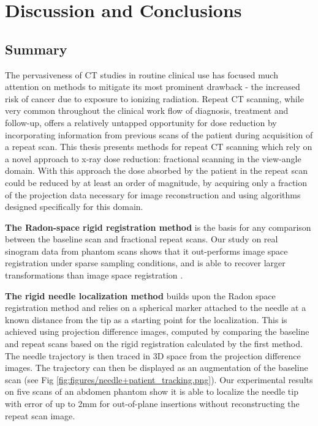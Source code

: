 \chapter{Discussion and Conclusions}

\label{ch:conclusions}

\section{Summary}

The pervasiveness of CT studies in routine clinical use has focused much attention on methods to mitigate its most prominent drawback - the increased risk of cancer due to exposure to ionizing radiation. 
Repeat CT scanning, while very common throughout the clinical work flow of diagnosis, treatment and follow-up, offers a relatively untapped opportunity for dose reduction by incorporating information from previous scans of the patient during acquisition of a repeat scan.
This thesis presents methods for repeat CT scanning which rely on a novel approach to x-ray dose reduction: fractional scanning in the view-angle domain. With this approach the dose absorbed by the patient in the repeat scan could be reduced by at least an order of magnitude, by acquiring only a fraction of the projection data necessary for image reconstruction and using algorithms designed specifically for this domain.

\textbf{The Radon-space rigid registration method} is the basis for any comparison between the baseline scan and fractional repeat scans.
Our study on real sinogram data from phantom scans shows that it out-performs image space registration under sparse sampling conditions, and is able to recover larger transformations than image space registration .

\textbf{The rigid needle localization method} builds upon the Radon space registration method and relies on a spherical marker attached to the needle at a known distance from the tip as a starting point for the localization. This is achieved using projection difference images, computed by comparing the baseline and repeat scans based on the rigid registration calculated by the first method. The needle trajectory is then traced in 3D space from the projection difference images. The trajectory can then be displayed as an augmentation of the baseline scan (see Fig \ref{fig:figures/needle+patient_tracking.png}). Our experimental results on five scans of an abdomen phantom show it is able to localize the needle tip with error of up to 2mm for out-of-plane insertions without reconstructing the repeat scan image.

